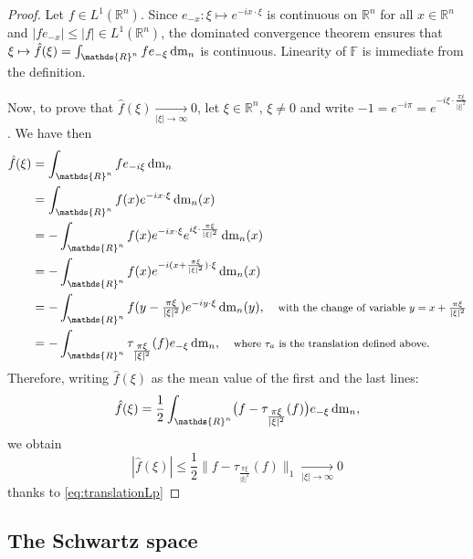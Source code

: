 \documentclass[a4paper, 12pt]{article}
\theoremstyle{plain}
\theoremstyle{definition}
\theoremstyle{remark}
\numberwithin{equation}{section}
\begin{document}
\begin{proof}
Let $f\in L^1({\mathds{R}}^n)$. Since $e_{-x}:\xi\mapsto e^{-ix\cdot\xi}$ is continuous on ${\mathds{R}}^n$ 
for all $x\in{\mathds{R}}^n$ and
$|fe_{-x}|\le |f| \in L^1({\mathds{R}}^n)$, the dominated convergence theorem ensures that 
$\xi\mapsto \hat{f}(\xi)=\int_{{\mathds{R}}^n}f e_{-\xi}\,{\rm dm}_n$ is continuous. Linearity of ${\mathds{F}}$ 
is immediate from the definition.

\noindent
Now, to prove that $\hat{f}(\xi)\xrightarrow[|\xi|\to\infty]{}0$, let $\xi\in {\mathds{R}}^n$, $\xi\neq 0$ and write 
$-1=e^{-i\pi}=e^{-i\xi\cdot\frac{\pi\xi}{|\xi|^2}}$. We have then
%
\begin{align*}
\hat{f}(\xi)&= \int_{{\mathds{R}}^n} f e_{-i\xi}\,{\rm dm}_n\\
&=\int_{{\mathds{R}}^n} f(x) e^{-ix\cdot\xi}\,{\rm dm}_n(x)\\
&=-\int_{{\mathds{R}}^n} f(x) e^{-ix\cdot\xi}e^{i\xi\cdot\frac{\pi\xi}{|\xi|^2}}\,{\rm dm}_n(x)\\
&=-\int_{{\mathds{R}}^n} f(x) e^{-i(x+\frac{\pi\xi}{|\xi|^2})\cdot\xi}\,{\rm dm}_n(x)\\
&=-\int_{{\mathds{R}}^n} f(y-\tfrac{\pi\xi}{|\xi|^2}) e^{-iy\cdot\xi}\,{\rm dm}_n(y), \quad 
\mbox{\footnotesize with the change of variable $y=x+\tfrac{\pi\xi}{|\xi|^2}$}\\
&=-\int_{{\mathds{R}}^n} \tau_{\tfrac{\pi\xi}{|\xi|^2}}(f) e_{-\xi}\,{\rm dm}_n, \quad 
\mbox{\footnotesize where $\tau_a$ is the translation defined above}.
\end{align*}
%
Therefore, writing $\hat{f}(\xi)$ as the mean value of the first and the last lines:
\[
\hat{f}(\xi)=\frac{1}{2}\int_{{\mathds{R}}^n} \bigl(f-\tau_{\tfrac{\pi\xi}{|\xi|^2}}(f)\bigr)e_{-\xi}\,{\rm dm}_n,
\]
we obtain
\[
|\hat{f}(\xi)|\le \frac{1}{2}\bigl\|f-\tau_{\tfrac{\pi\xi}{|\xi|^2}}(f)\bigr\|_1\xrightarrow[|\xi|\to \infty]{}0
\]
thanks to \eqref{eq:translationLp}
\end{proof}

\subsection{The Schwartz space}
\end{document}

